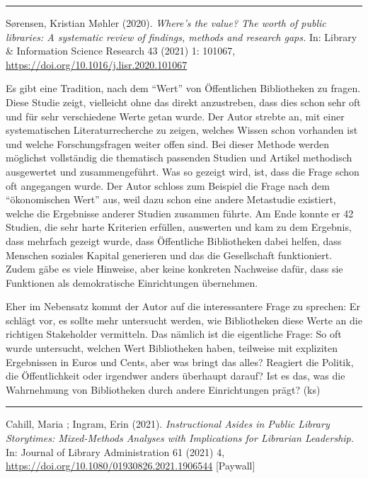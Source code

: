 \documentclass[a4paper,
fontsize=11pt,
oneside,
numbers=noperiodatend,
parskip=half-,
bibliography=totoc,
final
]{scrartcl}
\begin{document}
\begin{center}\rule{0.5\linewidth}{0.5pt}\end{center}

Sørensen, Kristian Møhler (2020). \emph{Where's the value? The worth of
public libraries: A systematic review of findings, methods and research
gaps.} In: Library \& Information Science Research 43 (2021) 1: 101067,
\url{https://doi.org/10.1016/j.lisr.2020.101067}

Es gibt eine Tradition, nach dem \enquote{Wert} von Öffentlichen
Bibliotheken zu fragen. Diese Studie zeigt, vielleicht ohne das direkt
anzustreben, dass dies schon sehr oft und für sehr verschiedene Werte
getan wurde. Der Autor strebte an, mit einer systematischen
Literaturrecherche zu zeigen, welches Wissen schon vorhanden ist und
welche Forschungsfragen weiter offen sind. Bei dieser Methode werden
möglichst vollständig die thematisch passenden Studien und Artikel
methodisch ausgewertet und zusammengeführt. Was so gezeigt wird, ist,
dass die Frage schon oft angegangen wurde. Der Autor schloss zum
Beispiel die Frage nach dem \enquote{ökonomischen Wert} aus, weil dazu
schon eine andere Metastudie existiert, welche die Ergebnisse anderer
Studien zusammen führte. Am Ende konnte er 42 Studien, die sehr harte
Kriterien erfüllen, auswerten und kam zu dem Ergebnis, dass mehrfach
gezeigt wurde, dass Öffentliche Bibliotheken dabei helfen, dass Menschen
soziales Kapital generieren und das die Gesellschaft funktioniert. Zudem
gäbe es viele Hinweise, aber keine konkreten Nachweise dafür, dass sie
Funktionen als demokratische Einrichtungen übernehmen.

Eher im Nebensatz kommt der Autor auf die interessantere Frage zu
sprechen: Er schlägt vor, es sollte mehr untersucht werden, wie
Bibliotheken diese Werte an die richtigen Stakeholder vermitteln. Das
nämlich ist die eigentliche Frage: So oft wurde untersucht, welchen Wert
Bibliotheken haben, teilweise mit expliziten Ergebnissen in Euros und
Cents, aber was bringt das alles? Reagiert die Politik, die
Öffentlichkeit oder irgendwer anders überhaupt darauf? Ist es das, was
die Wahrnehmung von Bibliotheken durch andere Einrichtungen prägt? (ks)

\begin{center}\rule{0.5\linewidth}{0.5pt}\end{center}

Cahill, Maria ; Ingram, Erin (2021). \emph{Instructional Asides in
Public Library Storytimes: Mixed-Methods Analyses with Implications for
Librarian Leadership.} In: Journal of Library Administration 61 (2021)
4, \url{https://doi.org/10.1080/01930826.2021.1906544} {[}Paywall{]}
\end{document}
